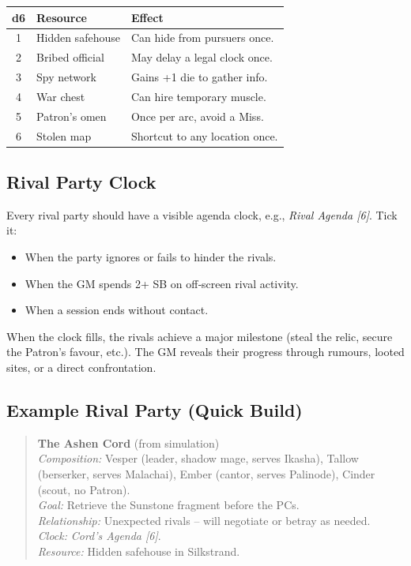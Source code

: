 \begin{tcolorbox}[title=Additional Resource (off‑screen), colback=white!97!gray, colframe=black!80!gray]
\centering
\begin{tabular}{cll}
\toprule
\textbf{d6} & \textbf{Resource} & \textbf{Effect} \\
\midrule
1 & Hidden safehouse & Can hide from pursuers once. \\
2 & Bribed official & May delay a legal clock once. \\
3 & Spy network & Gains +1 die to gather info. \\
4 & War chest & Can hire temporary muscle. \\
5 & Patron’s omen & Once per arc, avoid a Miss. \\
6 & Stolen map & Shortcut to any location once. \\
\bottomrule
\end{tabular}
\end{tcolorbox}

\subsection*{Rival Party Clock}
Every rival party should have a visible agenda clock, e.g., \emph{Rival Agenda [6]}. Tick it:
\begin{itemize}
  \item When the party ignores or fails to hinder the rivals.
  \item When the GM spends 2+ SB on off‑screen rival activity.
  \item When a session ends without contact.
\end{itemize}
When the clock fills, the rivals achieve a major milestone (steal the relic, secure the Patron’s favour, etc.). The GM reveals their progress through rumours, looted sites, or a direct confrontation.

\subsection*{Example Rival Party (Quick Build)}
\begin{quote}
\textbf{The Ashen Cord} (from simulation)\\
\emph{Composition:} Vesper (leader, shadow mage, serves Ikasha), Tallow (berserker, serves Malachai), Ember (cantor, serves Palinode), Cinder (scout, no Patron).\\
\emph{Goal:} Retrieve the Sunstone fragment before the PCs.\\
\emph{Relationship:} Unexpected rivals – will negotiate or betray as needed.\\
\emph{Clock:} \emph{Cord’s Agenda [6]}.\\
\emph{Resource:} Hidden safehouse in Silkstrand.
\end{quote}

